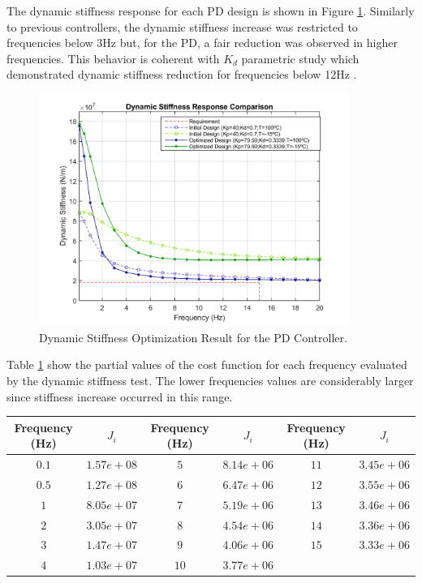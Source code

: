 The  dynamic stiffness response for each PD design is shown in Figure \ref{fig:5_1_3_PD_DynStif}. Similarly to previous controllers, the dynamic stiffness increase was restricted to frequencies below 3Hz but, for the PD, a fair reduction was observed in higher frequencies. This behavior is coherent with $K_d$ parametric study which demonstrated dynamic stiffness reduction for frequencies below 12Hz \cite{Ballesteros}.

\begin{figure}[H]
	\centering
	\centerline{\includegraphics[width=0.9\textwidth]{Figuras/5.OptimizationResults/5-1-3-PD-DynamicStiffnessComparison.jpg}}
	\caption{Dynamic Stiffness Optimization Result for the PD Controller.}
	\label{fig:5_1_3_PD_DynStif}
\end{figure}

Table \ref{table:5_1_3_PD_CostFunctionTable} show the partial values of the cost function for each frequency evaluated by the dynamic stiffness test. The lower frequencies values are considerably larger since stiffness increase occurred in this range. 

\begin{table}[H]
	\label{table:5_1_3_PD_CostFunctionTable}
	\centering
	\resizebox{14cm}{!} {
		\begin{tabular}{|c|c|c|c|c|c|}
			\hline
			Frequency (Hz) & $J_i$ & Frequency (Hz) & $J_i$ & Frequency (Hz) & $J_i$ \\ \hline
			$0.1$ & $1.57e+08$ & $5$ & $8.14e+06$ & $11$ & $3.45e+06$ \\ \hline
			$0.5$ & $1.27e+08$ & $6$ & $6.47e+06$ & $12$ & $3.55e+06$ \\ \hline
			$1$ & $8.05e+07$ & $7$ & $5.19e+06$ & $13$ & $3.46e+06$ \\ \hline
			$2$ & $3.05e+07$ & $8$ & $4.54e+06$ & $14$ & $3.36e+06$ \\ \hline
			$3$ & $1.47e+07$ & $9$ & $4.06e+06$ & $15$ & $3.33e+06$ \\ \hline
			$4$ & $1.03e+07$ & $10$ & $3.77e+06$ &  &  \\ \hline
	\end{tabular}}
\end{table}


